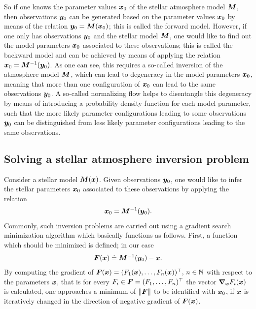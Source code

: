 \documentclass[a4paper,12pt]{report}
\def\lk#1{{\color{black}{#1}}}
\begin{document}
So if one knows the parameter values $\bm{x}_0$ of the stellar atmosphere model $\bm{M}$, then observations $\bm{y}_0$ can be generated based on the parameter values $\bm{x}_0$ by means of the relation $\bm{y}_0 = \bm{M}(\bm{x}_0)$; this is called the forward model. However, if one only has observations $\bm{y}_0$ and the stellar model $\bm{M}$, one would like to find out the model parameters $\bm{x}_0$ associated to these observations; this is called the backward model and can be achieved by means of applying the relation $\bm{x}_0 = \bm{M}^{-1}(\bm{y}_0)$. As one can see, this requires a so-called inversion of the atmosphere model $\bm{M}$, which can lead to degeneracy in the model parameters $\bm{x}_0$, meaning that more than one configuration of $\bm{x}_0$ can lead to the same observations $\bm{y}_0$. A so-called normalizing flow \lk{as it will be explained in the subsequent chapter} helps to disentangle this degeneracy by means of introducing a probability density function for each model parameter, such that the more likely parameter configurations leading to some observations $\bm{y}_0$ can be distinguished from less likely parameter configurations leading to the same observations.

\subsection{Solving a stellar atmosphere inversion problem}
Consider a stellar model $\bm{M}(\bm{x})$. Given observations $\bm{y}_0$, one would like to infer the stellar parameters $\bm{x}_0$ associated to these observations by applying the relation \begin{equation}
\bm{x}_0 = \bm{M}^{-1}(\bm{y}_0).
\end{equation} Commonly, such inversion problems are carried out using a gradient search minimization algorithm which basically functions as follows. First, a function which should be minimized is defined; in our case \begin{equation}
\bm{F}(\bm{x}) \doteq \bm{M}^{-1}(\bm{y}_0) - \bm{x}.
\end{equation} By computing the gradient of $\bm{F}(\bm{x}) = (F_1(\bm{x}), \dots, F_n(\bm{x}))^\top,\,n\in\mathbb{N}$ with respect to the parameters $\bm{x}$, that is for every $F_i \in \bm{F} = (F_1,\dots,F_n)^\top$ the vector $\bm{\nabla}_{\bm{x}}F_i(\bm{x})$ is calculated, one approaches a minimum of $\|\bm{F}\|$ to be identified with $\bm{x}_0$, if $\bm{x}$ is iteratively changed in the direction of negative gradient of $\bm{F}(\bm{x})$.
\end{document}
